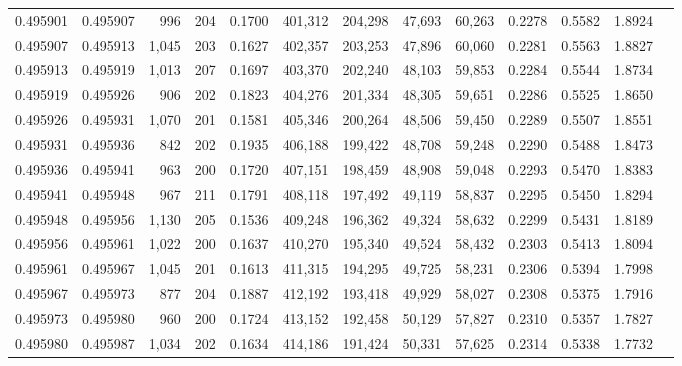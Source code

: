 \begin{tabular}{rrrrrrrrrrrrr}
0.495901 & 0.495907 &   996 & 204 &                                     0.1700 & 401,312 & 204,298 &  47,693 &  60,263 & 0.2278 & 0.5582 & 1.8924 \\
0.495907 & 0.495913 & 1,045 & 203 &                                     0.1627 & 402,357 & 203,253 &  47,896 &  60,060 & 0.2281 & 0.5563 & 1.8827 \\
0.495913 & 0.495919 & 1,013 & 207 &                                     0.1697 & 403,370 & 202,240 &  48,103 &  59,853 & 0.2284 & 0.5544 & 1.8734 \\
0.495919 & 0.495926 &   906 & 202 &                                     0.1823 & 404,276 & 201,334 &  48,305 &  59,651 & 0.2286 & 0.5525 & 1.8650 \\
0.495926 & 0.495931 & 1,070 & 201 &                                     0.1581 & 405,346 & 200,264 &  48,506 &  59,450 & 0.2289 & 0.5507 & 1.8551 \\
0.495931 & 0.495936 &   842 & 202 &                                     0.1935 & 406,188 & 199,422 &  48,708 &  59,248 & 0.2290 & 0.5488 & 1.8473 \\
0.495936 & 0.495941 &   963 & 200 &                                     0.1720 & 407,151 & 198,459 &  48,908 &  59,048 & 0.2293 & 0.5470 & 1.8383 \\
0.495941 & 0.495948 &   967 & 211 &                                     0.1791 & 408,118 & 197,492 &  49,119 &  58,837 & 0.2295 & 0.5450 & 1.8294 \\
0.495948 & 0.495956 & 1,130 & 205 &                                     0.1536 & 409,248 & 196,362 &  49,324 &  58,632 & 0.2299 & 0.5431 & 1.8189 \\
0.495956 & 0.495961 & 1,022 & 200 &                                     0.1637 & 410,270 & 195,340 &  49,524 &  58,432 & 0.2303 & 0.5413 & 1.8094 \\
0.495961 & 0.495967 & 1,045 & 201 &                                     0.1613 & 411,315 & 194,295 &  49,725 &  58,231 & 0.2306 & 0.5394 & 1.7998 \\
0.495967 & 0.495973 &   877 & 204 &                                     0.1887 & 412,192 & 193,418 &  49,929 &  58,027 & 0.2308 & 0.5375 & 1.7916 \\
0.495973 & 0.495980 &   960 & 200 &                                     0.1724 & 413,152 & 192,458 &  50,129 &  57,827 & 0.2310 & 0.5357 & 1.7827 \\
0.495980 & 0.495987 & 1,034 & 202 &                                     0.1634 & 414,186 & 191,424 &  50,331 &  57,625 & 0.2314 & 0.5338 & 1.7732 \\

\end{tabular}
